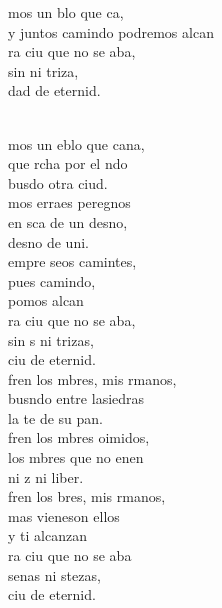 \documentclass[12pt]{article}
\begin{document}
\begin{multicols*}{2}
\begin{cancion}%
	\begin{chorus}%
	mos un blo que ca,\\
	y juntos camindo podremos alcan\\
	ra ciu que no se aba,\\
	sin  ni triza,\\
	dad de eternid.\\
	\end{chorus}%
	\jump\\
	mos un eblo que cana,\\
	que rcha por el ndo\\
	busdo otra ciud.\\
	mos erraes peregnos\\
	en sca de un desno,\\
	desno de uni.\\
	empre seos camintes,\\
	pues  camindo,\\
	pomos alcan\\
	ra ciu que no se aba,\\
	sin s ni trizas,\\
	ciu de eternid.\\
	fren los mbres, mis rmanos,\\
	busndo entre lasiedras\\
	la te de su pan.\\
	fren los mbres oimidos,\\
	los mbres que no enen\\
	ni z ni liber.\\
	fren los bres, mis rmanos,\\
	mas vieneson ellos\\
	y ti alcanzan\\
	ra ciu que no se aba\\
	senas ni stezas,\\
	ciu de eternid.\\
\end{cancion}%


\end{multicols*}
\end{document}
